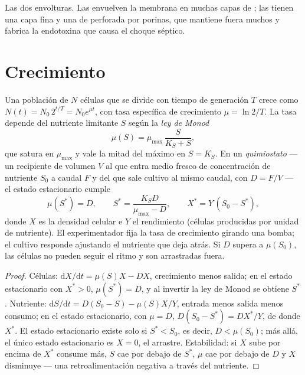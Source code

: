 \begin{omfigure}
{\small Las dos envolturas. Las  envuelven la membrana en
muchas capas de ; las  tienen una capa fina y
una  de  perforada por porinas, que
mantiene fuera muchos  y fabrica la endotoxina que causa el
choque séptico.}
\end{omfigure}

\section{Crecimiento}

\begin{theorem}\label{thm:b3:bacteriology:monod}
Una población de $N$ células que se divide con tiempo de generación $T$
crece como $N(t) = N_{0}\,2^{t/T} = N_{0}e^{\mu t}$, con tasa específica
de crecimiento $\mu =
\ln 2/T$. La tasa depende del nutriente limitante $S$ según la \emph{ley
de Monod}
\[
\mu(S) = \mu_{\max}\,\frac{S}{K_{S} + S},
\]
que satura en $\mu_{\max}$ y vale la mitad del máximo en $S = K_{S}$. En
un \emph{quimiostato} --- un recipiente de volumen $V$ al que entra medio
fresco de concentración de nutriente $S_{0}$ a caudal $F$ y del que sale
cultivo al mismo caudal, con  $D = F/V$ --- el estado
estacionario cumple
\[
\mu(S^{*}) = D,\qquad S^{*} = \frac{K_{S}D}{\mu_{\max} - D},\qquad
X^{*} = Y\,(S_{0} - S^{*}),
\]
donde $X$ es la densidad celular e $Y$ el rendimiento (células producidas
por unidad de nutriente). El experimentador fija la tasa de crecimiento
girando una bomba; el cultivo responde ajustando el nutriente que deja
atrás. Si $D$ supera a $\mu(S_{0})$, las células no pueden seguir el
ritmo y son arrastradas fuera.
\end{theorem}
\begin{proof}
Células: $\mathrm{d}X/\mathrm{d}t = \mu(S)X - DX$, crecimiento menos
salida; en el estado estacionario con $X^{*} > 0$, $\mu(S^{*}) = D$, y al
invertir la ley de Monod se obtiene $S^{*}$. Nutriente:
$\mathrm{d}S/\mathrm{d}t = D(S_{0} -
S) - \mu(S)X/Y$, entrada menos salida menos consumo; en el estado
estacionario, con $\mu = D$, $D(S_{0} - S^{*}) = DX^{*}/Y$, de donde
$X^{*}$. El estado estacionario existe solo si $S^{*} < S_{0}$, es decir,
$D <
\mu(S_{0})$; más allá, el único estado estacionario es $X = 0$, el
arrastre. Estabilidad: si $X$ sube por encima de $X^{*}$ consume más, $S$
cae por debajo de $S^{*}$, $\mu$ cae por debajo de $D$ y $X$ disminuye
--- una retroalimentación negativa a través del nutriente.
\end{proof}

